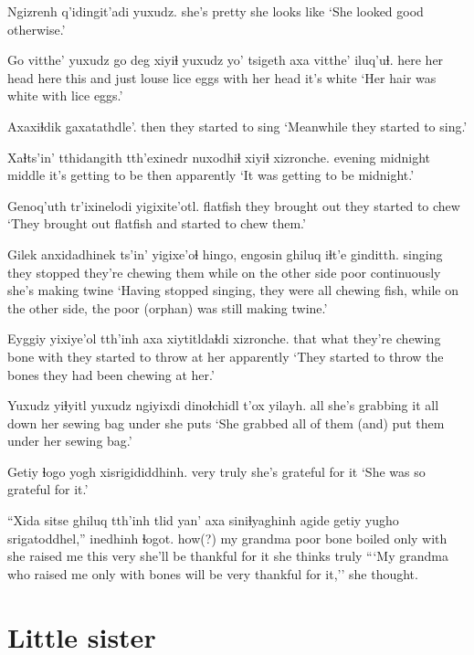 \documentclass[12pt]{article}
\begin{document}
\gll Ngizrenh     q'idingit'adi yuxudz.
{she's pretty} {she looks like}
\glt `She looked good otherwise.'
\glend

\gll Go   vitthe'   yuxudz go   deg  xiyiɬ yuxudz yo'   tsigeth   axa  vitthe'  iluq'uɬ.
here {her head} {}    here this and  just louse {lice eggs} with {her head} {it's white}
\glt `Her hair was white with lice eggs.'
\glend

\gll Axaxiɬdik gaxatathdle'.
then      {they started to sing}
\glt `Meanwhile they started to sing.'
\glend

\gll Xaɬts'in' tthidangith tth'exinedr nuxodhiɬ           xiyiɬ xizronche.
evening   midnight    {middle}    {it's getting to be} then apparently
\glt `It was getting to be midnight.'
\glend

\gll Genoq'uth tr'ixinelodi        yigixite'otl.
flatfish  {they brought out}  {they started to chew}
\glt `They brought out flatfish and started to chew them.'
\glend

\gll Gilek anxidadhinek ts'in' yigixe'oɬ           hingo, engosin           ghiluq iɬt'e        ginditth.
singing {they stopped} {} {they're chewing them } while {on the other side} poor   continuously {she's making twine}
\glt `Having stopped singing, they were all chewing fish, while on the other side, the poor (orphan) was still making twine.'
\glend

\gll Eyggiy yixiye'ol        tth'inh axa  xiytitldaɬdi xizronche.
that   {what they're chewing} bone    with {they started to throw at her} apparently
\glt `They started to throw the bones they had been chewing at her.'
\glend

\gll Yuxudz yiɬyitl        yuxudz ngiyixdi dinoɬchidl   t'ox  yilayh.
all    {she's grabbing it} all  down  {her sewing bag} under {she puts}
\glt `She grabbed all of them (and) put them under her sewing bag.'
\glend

\gll Getiy ɬogo  {yogh xisrigididdhinh.}
very  truly  {she's grateful for it}
\glt `She was so grateful for it.'
\glend

\gll ``Xida  sitse      ghiluq tth'inh tlid   yan' axa siniɬyaghinh agide getiy {yugho srigatoddhel,''} inedhinh ɬogot.
how(?) {my grandma} poor    bone    boiled only with {she raised me} this  very  {she'll be thankful for it} {she thinks} truly
\glt ```My grandma who raised me only with bones will be very thankful for it,'' she thought.
\glend

\section*{Little sister}
\end{document}
